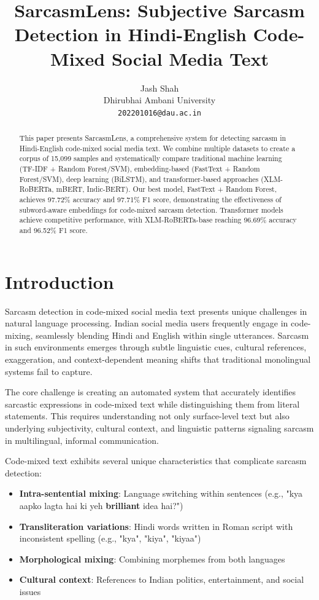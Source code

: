 \documentclass[11pt]{article}
\title{SarcasmLens: Subjective Sarcasm Detection in Hindi-English Code-Mixed Social Media Text}
\author{
  Jash Shah \\
  Dhirubhai Ambani University \\
  \texttt{202201016@dau.ac.in}
}
\begin{document}
\maketitle

\begin{abstract}
\sloppy
This paper presents SarcasmLens, a comprehensive system for detecting sarcasm in Hindi-English code-mixed social media text. We combine multiple datasets to create a corpus of 15,099 samples and systematically compare traditional machine learning (TF-IDF + Random Forest/SVM), embedding-based (FastText + Random Forest/SVM), deep learning (BiLSTM), and transformer-based approaches (XLM-RoBERTa, mBERT, Indic-BERT). Our best model, FastText + Random Forest, achieves 97.72\% accuracy and 97.71\% F1 score, demonstrating the effectiveness of subword-aware embeddings for code-mixed sarcasm detection. Transformer models achieve competitive performance, with XLM-RoBERTa-base reaching 96.69\% accuracy and 96.52\% F1 score.
\end{abstract}

\section{Introduction}

Sarcasm detection in code-mixed social media text presents unique challenges in natural language processing. Indian social media users frequently engage in code-mixing, seamlessly blending Hindi and English within single utterances. Sarcasm in such environments emerges through subtle linguistic cues, cultural references, exaggeration, and context-dependent meaning shifts that traditional monolingual systems fail to capture.

The core challenge is creating an automated system that accurately identifies sarcastic expressions in code-mixed text while distinguishing them from literal statements. This requires understanding not only surface-level text but also underlying subjectivity, cultural context, and linguistic patterns signaling sarcasm in multilingual, informal communication.

Code-mixed text exhibits several unique characteristics that complicate sarcasm detection:
\begin{itemize}
\item \textbf{Intra-sentential mixing}: Language switching within sentences (e.g., "kya aapko lagta hai ki yeh \textbf{brilliant} idea hai?")
\item \textbf{Transliteration variations}: Hindi words written in Roman script with inconsistent spelling (e.g., "kya", "kiya", "kiyaa")
\item \textbf{Morphological mixing}: Combining morphemes from both languages
\item \textbf{Cultural context}: References to Indian politics, entertainment, and social issues
\end{itemize}
\end{document}
